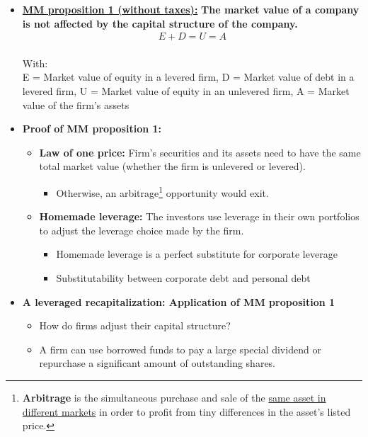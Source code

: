\documentclass[ieeetran]{article}
\begin{document}
\begin{itemize}
\item \underline{\textbf{MM proposition 1 (without taxes):}} \textbf{The market value of a company is not affected by the capital structure of the company.}
	\large
	\begin{equation*}
	\boxed{
	\begin{aligned}
	E + D = U = A
	\end{aligned}
	}
	\end{equation*}
	\\
	\normalsize
	With:\\
	E = Market value of equity in a levered firm, D = Market value of debt in a levered firm, U = Market value of equity in an unlevered firm, A = Market value of the firm's assets

\item \textbf{Proof of MM proposition 1:}
	\begin{itemize}
	  \item \textbf{Law of one price:} Firm's securities and its assets need to have the same total market value (whether the firm is unlevered or levered).
		  \begin{itemize}
			  \item Otherwise, an arbitrage\footnote{\textbf{Arbitrage} is the simultaneous purchase and sale of the \underline{same asset in different markets} in order to profit from tiny differences in the asset's listed price.} opportunity would exit.
		  \end{itemize}
\item \textbf{Homemade leverage:} The investors use leverage in their own portfolios to adjust the leverage choice made by the firm.
	\begin{itemize}
	  \item Homemade leverage is a perfect substitute for corporate leverage
	\item Substitutability between corporate debt and personal debt
	\end{itemize}
	\end{itemize}
\item \textbf{A leveraged recapitalization: Application of MM proposition 1}
	\begin{itemize}
	  \item How do firms adjust their capital structure?
	\item A firm can use borrowed funds to pay a large special dividend or repurchase a significant amount of outstanding shares.
  \end{itemize}
\end{itemize}
\end{document}
